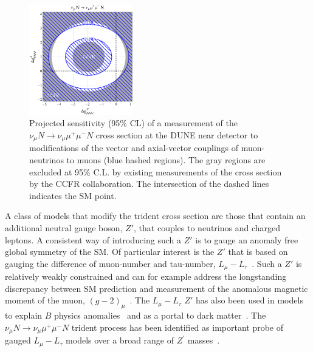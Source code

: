 \begin{figure}[tb!]
\centering
\includegraphics[width=0.4\textwidth]{graphics/model_independent.pdf}
\caption{Projected sensitivity (95\% CL) of a measurement of the $\nu_\mu N \to \nu_\mu \mu^+\mu^- N$ cross section at the DUNE near detector to modifications of the vector and axial-vector couplings of muon-neutrinos to muons (blue hashed regions). The gray regions are excluded at 95\% C.L. by existing measurements of the cross section by the CCFR collaboration. The intersection of the dashed lines indicates the SM point.}
\label{fig:trident_gVgA}
\end{figure}

A class of models that modify the trident cross section are those that contain an additional neutral gauge boson, $Z'$, that couples to neutrinos and charged leptons. A consistent way of introducing such a $Z'$ is to gauge an anomaly free global symmetry of the SM. Of particular interest is the $Z'$ that is based on gauging the difference of muon-number and tau-number, $L_\mu - L_\tau$~\cite{He:1990pn,He:1991qd}. Such a $Z'$ is relatively weakly constrained and can for example address the longstanding discrepancy between SM prediction and measurement of the anomalous magnetic moment of the muon, $(g-2)_\mu$~\cite{Baek:2001kca,Harigaya:2013twa}. The $L_\mu - L_\tau$ $Z'$ has also been used in models to explain $B$ physics anomalies~\cite{Altmannshofer:2014cfa} and as a portal to dark matter~\cite{Baek:2008nz,Altmannshofer:2016jzy}. The $\nu_\mu N \to \nu_\mu \mu^+\mu^- N$ trident process has been identified as important probe of gauged $L_\mu - L_\tau$ models over a broad range of $Z^\prime$ masses~\cite{Altmannshofer:2014cfa,Altmannshofer:2014pba}.

